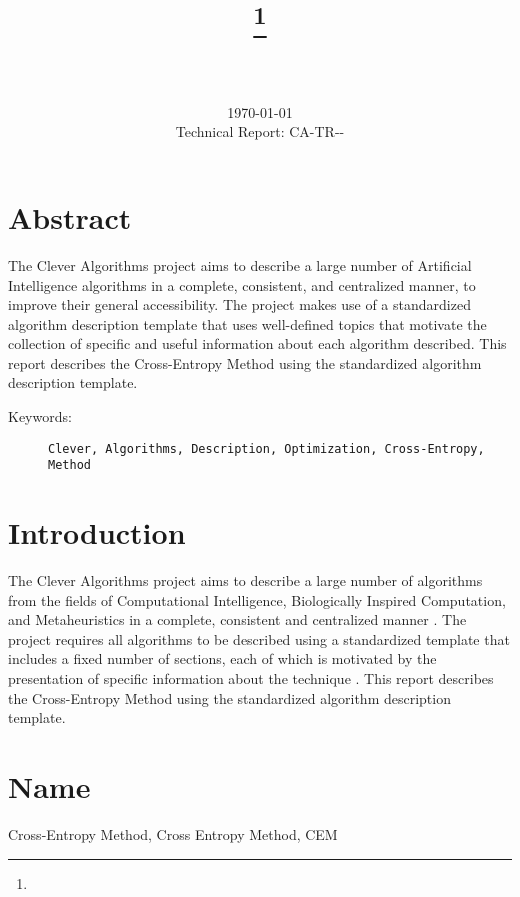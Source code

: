 \documentclass[a4paper, 11pt]{article}
\title{{\myreporttitle}\footnote{\myreportlicense}}
\author{\myreportauthor\\{\myreportemail}\\\small\myreportproject}
\date{\today\\{\small{Technical Report: CA-TR-{\myreportdate}-\myreportversion}}}
\begin{document}
\maketitle

\section*{Abstract} 
The Clever Algorithms project aims to describe a large number of Artificial Intelligence algorithms in a complete, consistent, and centralized manner, to improve their general accessibility. 
The project makes use of a standardized algorithm description template that uses well-defined topics that motivate the collection of specific and useful information about each algorithm described.
This report describes the Cross-Entropy Method using the standardized algorithm description template.

\begin{description}
	\item[Keywords:] {\small\texttt{Clever, Algorithms, Description, Optimization, Cross-Entropy, Method}}
\end{description} 

\section{Introduction} 
\label{sec:intro}
The Clever Algorithms project aims to describe a large number of algorithms from the fields of Computational Intelligence, Biologically Inspired Computation, and Metaheuristics in a complete, consistent and centralized manner \cite{Brownlee2010}.
The project requires all algorithms to be described using a standardized template that includes a fixed number of sections, each of which is motivated by the presentation of specific information about the technique \cite{Brownlee2010a}.
This report describes the Cross-Entropy Method using the standardized algorithm description template.

\section{Name} 
\label{sec:name}
Cross-Entropy Method, Cross Entropy Method, CEM
\end{document}
